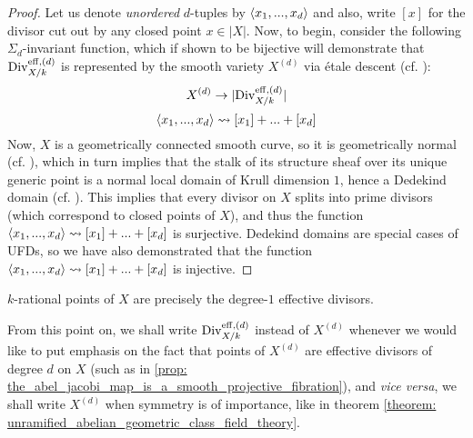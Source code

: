             \begin{proof}
                Let us denote \textit{unordered} $d$-tuples by $\langle x_1, ..., x_d\rangle$ and also, write $[x]$ for the divisor cut out by any closed point $x \in |X|$. Now, to begin, consider the following $\Sigma_d$-invariant function, which if shown to be bijective will demonstrate that $\mathrm{Div}_{X/k}^{\mathrm{eff}, (d)}$ is represented by the smooth variety $X^{(d)}$ via \'etale descent (cf. \cite[\href{https://stacks.math.columbia.edu/tag/024V}{Tag 024V}]{stacks}):
                    $$X^{(d)} \to |\mathrm{Div}_{X/k}^{\mathrm{eff}, (d)}|$$
                    $$\langle x_1, ..., x_d\rangle \leadsto [x_1] + ... + [x_d]$$
                Now, $X$ is a geometrically connected smooth curve, so it is geometrically normal (cf. \cite[\href{https://stacks.math.columbia.edu/tag/056T}{Tag 056T}]{stacks}), which in turn implies that the stalk of its structure sheaf over its unique generic point is a normal local domain of Krull dimension $1$, hence a Dedekind domain (cf. \cite[\href{https://stacks.math.columbia.edu/tag/034X}{Tag 034X}]{stacks}). This implies that every divisor on $X$ splits into prime divisors (which correspond to closed points of $X$), and thus the function $\langle x_1, ..., x_d\rangle \leadsto [x_1] + ... + [x_d]$ is surjective. Dedekind domains are special cases of UFDs, so we have also demonstrated that the function $\langle x_1, ..., x_d\rangle \leadsto [x_1] + ... + [x_d]$ is injective.
            \end{proof}
        \begin{corollary}
            $k$-rational points of $X$ are precisely the degree-$1$ effective divisors.
        \end{corollary}
        \begin{convention}
            From this point on, we shall write $\mathrm{Div}_{X/k}^{\mathrm{eff}, (d)}$ instead of $X^{(d)}$ whenever we would like to put emphasis on the fact that points of $X^{(d)}$ are effective divisors of degree $d$ on $X$ (such as in \ref{prop: the_abel_jacobi_map_is_a_smooth_projective_fibration}), and \textit{vice versa}, we shall write $X^{(d)}$ when symmetry is of importance, like in theorem \ref{theorem: unramified_abelian_geometric_class_field_theory}.
        \end{convention}
        
